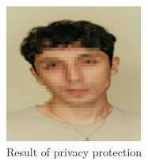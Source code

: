 \documentclass[12pt,a4paper]{article}
\begin{document}
\begin{figure}[h]
    \centering
    \includegraphics[width=0.4\textwidth]{data/blurred/sample_image.jpg}
    \caption{Result of privacy protection}
    \label{fig:privacy_protection}
\end{figure}
\end{document}
